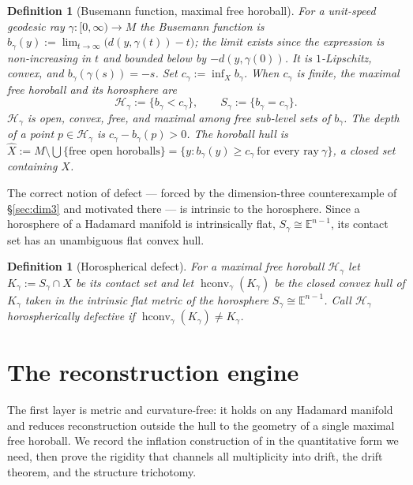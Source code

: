 \documentclass[11pt]{article}
\newtheorem{definition}[theorem]{Definition}
\theoremstyle{remark}
\newcommand{\X}{X}
\newcommand{\Xhat}{\widehat{\X}}
\newcommand{\Hb}[1]{\mathcal{H}_{#1}}
\newcommand{\Sb}[1]{S_{#1}}
\begin{document}
\begin{definition}[Busemann function, maximal free horoball]
\label{def:busemann}
For a unit-speed geodesic ray $\gamma:[0,\infty)\to M$ the
\emph{Busemann function} is
$b_{\gamma}(y):=\lim_{t\to\infty}\bigl(d(y,\gamma(t))-t\bigr)$; the
limit exists since the expression is non-increasing in $t$ and bounded
below by $-d(y,\gamma(0))$. It is $1$-Lipschitz, convex, and
$b_{\gamma}(\gamma(s))=-s$. Set $c_{\gamma}:=\inf_{\X}b_{\gamma}$.
When $c_{\gamma}$ is finite, the \emph{maximal free horoball} and its
\emph{horosphere} are
\[
\Hb{\gamma}:=\{b_{\gamma}<c_{\gamma}\},\qquad
\Sb{\gamma}:=\{b_{\gamma}=c_{\gamma}\}.
\]
$\Hb{\gamma}$ is open, convex, free, and maximal among free
sub-level sets of $b_{\gamma}$. The \emph{depth} of a point
$p\in\Hb{\gamma}$ is $c_{\gamma}-b_{\gamma}(p)>0$. The
\emph{horoball hull} is
$\Xhat:=M\setminus\bigcup\{\text{free open horoballs}\}
=\{y : b_{\gamma}(y)\ge c_{\gamma}\ \text{for every ray}\
\gamma\}$, a closed set containing $\X$.
\end{definition}

The correct notion of defect --- forced by the
dimension-three counterexample of \S\ref{sec:dim3} and motivated there
--- is intrinsic to the horosphere. Since a horosphere of a Hadamard
manifold is intrinsically flat, $\Sb{\gamma}\cong\mathbb{E}^{n-1}$, its
contact set has an unambiguous flat convex hull.

\begin{definition}[Horospherical defect]\label{def:hdefect}
For a maximal free horoball $\Hb{\gamma}$ let $K_{\gamma}:=
\Sb{\gamma}\cap\X$ be its contact set and let
$\operatorname{hconv}_{\gamma}(K_{\gamma})$ be the closed convex hull
of $K_{\gamma}$ taken in the intrinsic flat metric of the horosphere
$\Sb{\gamma}\cong\mathbb{E}^{n-1}$. Call $\Hb{\gamma}$
\emph{horospherically defective} if
$\operatorname{hconv}_{\gamma}(K_{\gamma})\neq K_{\gamma}$.
\end{definition}

\section{The reconstruction engine}\label{sec:inflation}

The first layer is metric and curvature-free: it holds
on any Hadamard manifold and reduces reconstruction outside the hull to
the geometry of a single maximal free horoball. We record the inflation
construction of \cite[Thm.~3.1]{R1} in the quantitative form we need,
then prove the rigidity that channels all multiplicity into drift, the
drift theorem, and the structure trichotomy.
\end{document}
